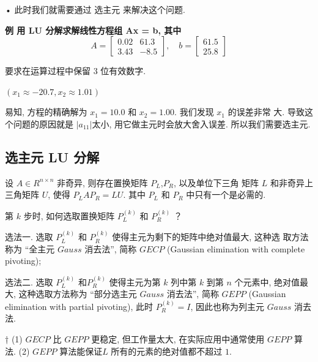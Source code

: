 \documentclass[12pt,a4paper]{article}
\begin{document}
• 此时我们就需要通过 选主元 来解决这个问题.

\begin{framed}
\bfseries{例} 用 LU 分解求解线性方程组 Ax = b, 其中
	\begin{equation}
	A=\left[\begin{array}{cc}{0.02} & {61.3} \\ {3.43} & {-8.5}\end{array}\right], \quad b=\left[\begin{array}{c}{61.5} \\ {25.8}\end{array}\right]
	\end{equation}

要求在运算过程中保留 3 位有效数字.	

$(x_1 ≈ −20.7, x_2 ≈ 1.01)$
\end{framed}

易知, 方程的精确解为 $x_1 = 10.0$ 和 $x_2 = 1.00$. 我们发现 $x_1$ 的误差非常
大. 导致这个问题的原因就是 $|a_{11}| $太小, 用它做主元时会放大舍入误差.
所以我们需要选主元.

\subsection{选主元 LU 分解}
\begin{framed}
\begin{theorem}
	设 $A ∈ R^{n×n}$ 非奇异, 则存在置换矩阵 $P_L$,$ P_R$, 以及单位下三角
	矩阵 $L$ 和非奇异上三角矩阵 $U$, 使得 $P_LAP_R = LU$. 其中 $P_L$ 和 $P_R$ 中只有一个是必需的.
\end{theorem}
\end{framed}

第 $k$ 步时, 如何选取置换矩阵 $P^{(k)}_L$ 和 $P^{(k)}_R$ ？

选法一. 选取 $P^{(k)}_L$ 和 $P^{(k)}_R$ 使得主元为剩下的矩阵中绝对值最大, 这种选
取方法称为 “全主元 $Gauss$ 消去法”, 简称 $GECP$ (Gaussian elimination
with complete pivoting);

选法二. 选取 $P^{(k)}_L$ 和$ P^{(k)}_R$ 使得主元为第 $k$ 列中第 $k$ 到第 $n$ 个元素中, 绝对值最大, 这种选取方法称为 “部分选主元 $Gauss$ 消去法”, 简称 $GEPP$
(Gaussian elimination with partial pivoting), 此时 $P^{(k)}_R = I$, 因此也称为列主元 $Gauss$ 消去法.

\begin{framed}
	† (1) $GECP$ 比 $GEPP$ 更稳定, 但工作量太大, 在实际应用中通常使用
	$GEPP$ 算法.
	(2) $GEPP$ 算法能保证$L$ 所有的元素的绝对值都不超过 $1$.
\end{framed}
\end{document}
